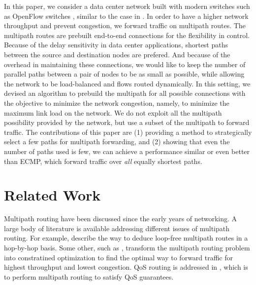 \documentclass[conference]{IEEEtran}
\begin{document}
In this paper, we consider a data center network built with modern switches
such as OpenFlow switches \cite{mabpprst08}, similar to the case in
\cite{baaz10}. In order to have a higher network throughput and prevent
congestion, we forward traffic on multipath routes. The multipath routes are
prebuilt end-to-end connections for the flexibility in control. Because of the
delay sensitivity in data center applications, shortest paths between the
source and destination nodes are prefered. And because of the overhead in
maintaining these connections, we would like to keep the number of parallel
paths between a pair of nodes to be as small as possible, while allowing the
network to be load-balanced and flows routed dynamically. In this setting, we
devised an algorithm to prebuild the multipath for all possible connections
with the objective to minimize the network congestion, namely, to minimize the
maximum link load on the network. We do not exploit all the multipath
possibility provided by the network, but use a subset of the multipath to
forward traffic. The contributions of this paper are (1) providing a method to
strategically select a few paths for multipath forwarding, and (2) showing that
even the number of paths used is few, we can achieve a performance similar or
even better than ECMP, which forward traffic over \emph{all} equally shortest
paths.

\section{Related Work}\label{sec:related}

Multipath routing have been discussed since the early years of networking. A
large body of literature is available addressing different issues of multipath
routing. For example, \cite{ns99,vg00,vg01,mpc08} describe the way to deduce
loop-free multipath routes in a hop-by-hop basis. Some other, such as
\cite{ft00,bo07}, transform the multipath routing problem into constratined
optimization to find the optimal way to forward traffic for highest throughput
and lowest congestion. QoS routing is addressed in
\cite{wc96,ms97,rfc2386,cn98,jng01}, which is to perform multipath routing to
satisfy QoS guarantees.
\end{document}
